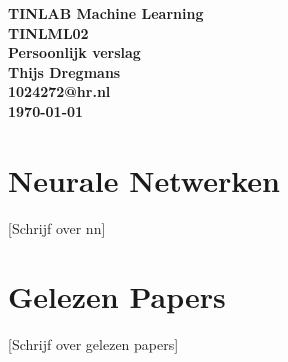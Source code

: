 \documentclass{article} %
\begin{document}
    \sffamily
    \begin{titlepage}
        \centering
        \vfill
        {\bfseries\Huge
            TINLAB Machine Learning \\
            \vskip1cm
        }
        {\bfseries\Large
            TINLML02 \\
            \vskip4cm
        }
        {\bfseries\Huge
            Persoonlijk verslag \\
            \vskip1cm
        }
        {\bfseries\Large
            Thijs Dregmans\\
        }
        {\bfseries\normalsize
            1024272@hr.nl\\
            \vskip1cm
            \today\\
        }    
        \vfill
        \vfill
        \vfill
    \end{titlepage}
    \newpage

    \tableofcontents
    \newpage

    \section{Neurale Netwerken}
    
        [Schrijf over nn]

    \newpage

    \section{Gelezen Papers}
    
        [Schrijf over gelezen papers]
    
    \newpage
\end{document}
